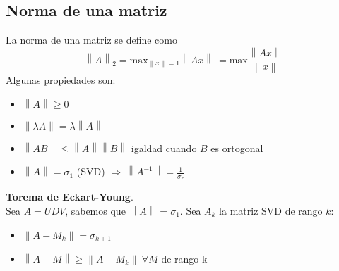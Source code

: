 \documentclass[12pt]{article}
\newcommand\norm[1]{\left\lVert#1\right\rVert}
\begin{document}
	\subsection{Norma de una matriz}
	La norma de una matriz se define como
	\[\norm{A}_2=\text{max}_{\norm{x}=1} \norm{Ax} \ =\text{max} \frac{\norm{Ax}}{\norm{x}}\]
	Algunas propiedades son:
	\begin{itemize}
		\item $\norm{A}\geq 0$
		\item $\norm{\lambda A}=\lambda \norm{A}$
		\item $\norm{AB}\leq \norm{A}\norm{B}$ igaldad cuando $B$ es ortogonal
		\item $\norm{A}=\sigma_1$ (SVD) $\Rightarrow \ \norm{A^{-1}}= \frac{1}{\sigma_r}$
	\end{itemize}	
	\textbf{Torema de Eckart-Young}. \\
	Sea $A=UDV$, sabemos que $\norm{A}=\sigma_1$. Sea $A_k$ la matriz SVD de rango $k$:
	\begin{itemize}
		\item $\norm{A-M_k}=\sigma_{k+1}$
		\item $\norm{A-M} \geq \norm{A-M_k} \ \forall M$ de rango k
	\end{itemize}
\end{document}
